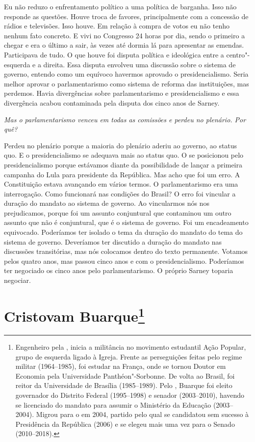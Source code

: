 Eu não reduzo o enfrentamento político a uma política
de barganha. Isso não responde as questões. Houve troca de favores,
principalmente com a concessão de rádios e televisões. Isso houve. Em
relação à compra de votos eu não tenho nenhum fato concreto. E vivi no
Congresso 24 horas por dia, sendo o primeiro a chegar e era o último a
sair, às vezes até dormia lá para apresentar as emendas. Participava de
tudo. O que houve foi disputa política e ideológica entre a
centro"-esquerda e a direita. Essa disputa envolveu uma discussão sobre o
sistema de governo, entendo como um equívoco havermos aprovado o
presidencialismo. Seria melhor aprovar o parlamentarismo como sistema de
reforma das instituições, mas perdemos. Havia divergências sobre
parlamentarismo e presidencialismo e essa divergência acabou contaminada
pela disputa dos cinco anos de Sarney.

\pagebreak

\noindent\emph{Mas o parlamentarismo venceu em todas as comissões e perdeu no
plenário. Por quê?}

Perdeu no plenário porque a maioria do plenário aderiu
ao governo, ao status quo. E o presidencialismo se adequava mais ao
status quo. O  se posicionou pelo presidencialismo porque estávamos
diante da possibilidade de lançar a primeira campanha do Lula para
presidente da República. Mas acho que foi um erro. A Constituição estava
avançando em vários termos. O parlamentarismo era uma interrogação. Como
funcionará nas condições do Brasil? O erro foi vincular a duração do
mandato ao sistema de governo. Ao vincularmos nós nos prejudicamos,
porque foi um assunto conjuntural que contaminou um outro assunto que
não é conjuntural, que é o sistema de governo. Foi um encadeamento
equivocado. Poderíamos ter isolado o tema da duração do mandato do tema
do sistema de governo. Deveríamos ter discutido a duração do mandato nas
discussões transitórias, mas nós colocamos dentro do texto permanente.
Votamos pelos quatro anos, mas passou cinco anos e com o
presidencialismo. Poderíamos ter negociado os cinco anos pelo
parlamentarismo. O próprio Sarney toparia negociar.

\chapter{Cristovam Buarque\footnote{Engenheiro pela , inicia a militância no movimento estudantil Ação
Popular, grupo de esquerda ligado à Igreja. Frente as perseguições
feitas pelo regime militar (1964--1985), foi estudar na França, onde se
tornou Doutor em Economia pela Universidade Panthéon"-Sorbonne. De volta
ao Brasil, foi reitor da Universidade de Brasília (1985--1989). Pelo ,
Buarque foi eleito governador do Distrito Federal (1995--1998) e senador
(2003--2010), havendo se licenciado do mandato para assumir o Ministério
da Educação (2003--2004). Migrou para o  em 2004, partido pelo qual se
candidatou sem sucesso à Presidência da República (2006) e se elegeu
mais uma vez para o Senado (2010--2018).}}

